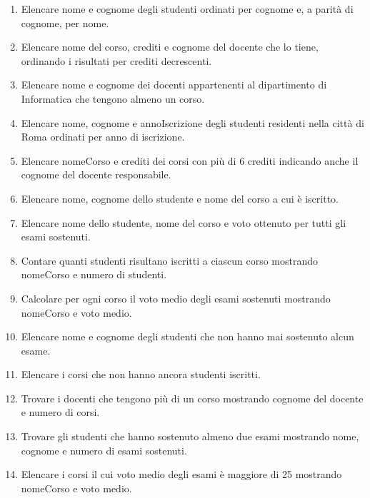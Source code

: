 \documentclass[a4paper,12pt]{article}
\begin{document}
\begin{enumerate}
	
	\item Elencare nome e cognome degli studenti ordinati per cognome e, a parità di cognome, per nome.
	
	\item Elencare nome del corso, crediti e cognome del docente che lo tiene, ordinando i risultati per crediti decrescenti.
	
	\item Elencare nome e cognome dei docenti appartenenti al dipartimento di Informatica che tengono almeno un corso.
	
	\item Elencare nome, cognome e annoIscrizione degli studenti residenti nella città di Roma ordinati per anno di iscrizione.
	
	\item Elencare nomeCorso e crediti dei corsi con più di 6 crediti indicando anche il cognome del docente responsabile.
	
	\item Elencare nome, cognome dello studente e nome del corso a cui è iscritto.
	
	\item Elencare nome dello studente, nome del corso e voto ottenuto per tutti gli esami sostenuti.
	
	\item Contare quanti studenti risultano iscritti a ciascun corso mostrando nomeCorso e numero di studenti.
	
	\item Calcolare per ogni corso il voto medio degli esami sostenuti mostrando nomeCorso e voto medio.
	
	\item Elencare nome e cognome degli studenti che non hanno mai sostenuto alcun esame.
	
	\item Elencare i corsi che non hanno ancora studenti iscritti.
	
	\item Trovare i docenti che tengono più di un corso mostrando cognome del docente e numero di corsi.
	
	\item Trovare gli studenti che hanno sostenuto almeno due esami mostrando nome, cognome e numero di esami sostenuti.
	
	\item Elencare i corsi il cui voto medio degli esami è maggiore di 25 mostrando nomeCorso e voto medio.
	

\end{enumerate}
\end{document}
